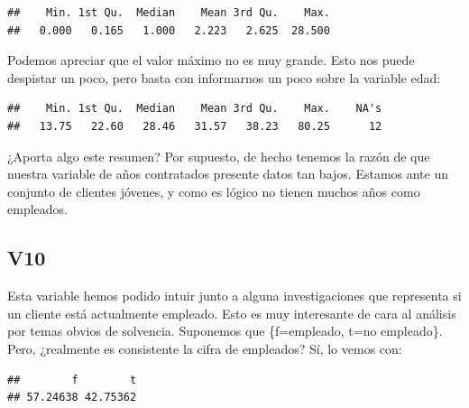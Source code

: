 \documentclass[
]{article}
\newenvironment{Shaded}{\begin{snugshade}}{\end{snugshade}}
\newcommand{\DecValTok}[1]{\textcolor[rgb]{0.00,0.00,0.81}{#1}}
\newcommand{\FunctionTok}[1]{\textcolor[rgb]{0.13,0.29,0.53}{\textbf{#1}}}
\newcommand{\NormalTok}[1]{#1}
\newcommand{\OtherTok}[1]{\textcolor[rgb]{0.56,0.35,0.01}{#1}}
\newcommand{\SpecialCharTok}[1]{\textcolor[rgb]{0.81,0.36,0.00}{\textbf{#1}}}
\begin{document}
\begin{verbatim}
##    Min. 1st Qu.  Median    Mean 3rd Qu.    Max. 
##   0.000   0.165   1.000   2.223   2.625  28.500
\end{verbatim}

Podemos apreciar que el valor máximo no es muy grande. Esto nos puede
despistar un poco, pero basta con informarnos un poco sobre la variable
edad:

\begin{Shaded}
\end{Shaded}

\begin{verbatim}
##    Min. 1st Qu.  Median    Mean 3rd Qu.    Max.    NA's 
##   13.75   22.60   28.46   31.57   38.23   80.25      12
\end{verbatim}

¿Aporta algo este resumen? Por supuesto, de hecho tenemos la razón de
que nuestra variable de años contratados presente datos tan bajos.
Estamos ante un conjunto de clientes jóvenes, y como es lógico no tienen
muchos años como empleados.

\hypertarget{v10}{%
\subsection{V10}\label{v10}}

Esta variable hemos podido intuir junto a alguna investigaciones que
representa si un cliente está actualmente empleado. Esto es muy
interesante de cara al análisis por temas obvios de solvencia. Suponemos
que \{f=empleado, t=no empleado\}. Pero, ¿realmente es consistente la
cifra de empleados? Sí, lo vemos con:

\begin{Shaded}
\end{Shaded}

\begin{verbatim}
##        f        t 
## 57.24638 42.75362
\end{verbatim}
\end{document}
